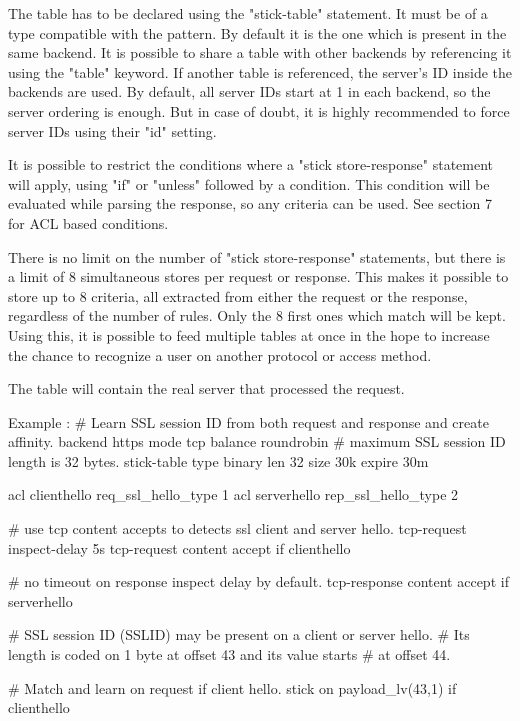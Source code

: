   The table has to be declared using the "stick-table" statement. It must be of
  a type compatible with the pattern. By default it is the one which is present
  in the same backend. It is possible to share a table with other backends by
  referencing it using the "table" keyword. If another table is referenced,
  the server's ID inside the backends are used. By default, all server IDs
  start at 1 in each backend, so the server ordering is enough. But in case of
  doubt, it is highly recommended to force server IDs using their "id" setting.

  It is possible to restrict the conditions where a "stick store-response"
  statement will apply, using "if" or "unless" followed by a condition. This
  condition will be evaluated while parsing the response, so any criteria can
  be used. See section 7 for ACL based conditions.

  There is no limit on the number of "stick store-response" statements, but
  there is a limit of 8 simultaneous stores per request or response. This
  makes it possible to store up to 8 criteria, all extracted from either the
  request or the response, regardless of the number of rules. Only the 8 first
  ones which match will be kept. Using this, it is possible to feed multiple
  tables at once in the hope to increase the chance to recognize a user on
  another protocol or access method.

  The table will contain the real server that processed the request.

  Example :
    # Learn SSL session ID from both request and response and create affinity.
    backend https
        mode tcp
        balance roundrobin
        # maximum SSL session ID length is 32 bytes.
        stick-table type binary len 32 size 30k expire 30m

        acl clienthello req_ssl_hello_type 1
        acl serverhello rep_ssl_hello_type 2

        # use tcp content accepts to detects ssl client and server hello.
        tcp-request inspect-delay 5s
        tcp-request content accept if clienthello

        # no timeout on response inspect delay by default.
        tcp-response content accept if serverhello

        # SSL session ID (SSLID) may be present on a client or server hello.
        # Its length is coded on 1 byte at offset 43 and its value starts
        # at offset 44.

        # Match and learn on request if client hello.
        stick on payload_lv(43,1) if clienthello

